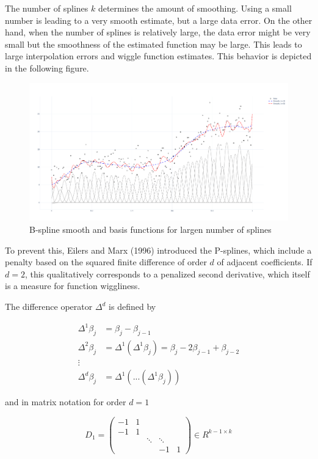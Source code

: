 \documentclass[10pt,a4paper]{article}
\begin{document}
	The number of splines $k$ determines the amount of smoothing. Using a small number is leading to a very smooth estimate, but a large data error. On the other hand, when the number of splines is relatively large, the data error might be very small but the smoothness of the estimated function may be large. This leads to large interpolation errors and wiggle function estimates. This behavior is depicted in the following figure.

	\begin{figure}[H]
		\centering
		\includegraphics[width=\linewidth]{thesisplots/smooth_wiggly_plus_basis.pdf}
		\caption{B-spline smooth and basis functions for largen number of splines}
		\label{fig:smooth_bf_large}
	\end{figure}
	
	To prevent this, Eilers and Marx (1996) introduced the P-splines, which include a penalty based on the squared finite difference of order $d$ of adjacent coefficients. If $d=2$, this qualitatively  corresponds to a penalized second derivative, which itself is a measure for function wiggliness.
	
	The difference operator $\Delta^d$ is defined by
		
	
	\begin{align*}
		\Delta^1 \beta_j &= \beta_j - \beta_{j-1} \\
		\Delta^2 \beta_j &= \Delta^1(\Delta^1 \beta_j) = \beta_j - 2\beta_{j-1} + \beta_{j-2} \\ 
	  	\vdots \\ 
	  	\Delta^d \beta_j &= \Delta^1(...(\Delta^1 \beta_j))
	\end{align*}
	
	and in matrix notation for order $d=1$
	
	$$D_1 = \begin{pmatrix} 
					-1& 1 &  & & \\  
					-1& 1 &  & & \\  
					  &   & \ddots & \ddots & \\ 
					  &   &  & -1 & 1 
			\end{pmatrix} \in R^{k-1\times k}$$
	
\end{document}

